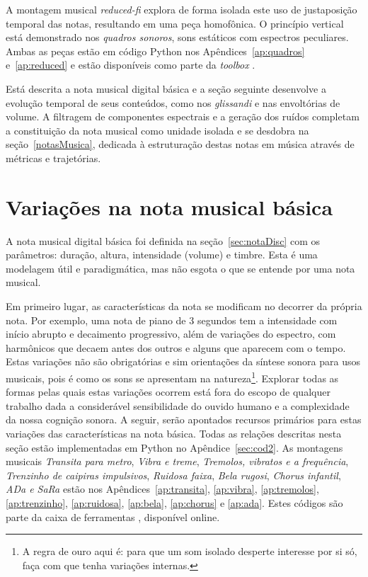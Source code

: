 A montagem musical \emph{reduced-fi} explora de forma isolada este uso de justaposição temporal das notas, resultando em uma peça homofônica. O princípio vertical está demonstrado nos \emph{quadros sonoros}, sons estáticos com espectros peculiares. Ambas as peças estão em código Python nos Apêndices~\ref{ap:quadros} e~\ref{ap:reduced} e estão disponíveis como parte da \emph{toolbox} \massa.\cite{MASSA}

Está descrita a nota musical digital básica e a seção seguinte desenvolve a evolução temporal de seus conteúdos, como nos \emph{glissandi} e nas envoltórias de volume. A filtragem de componentes espectrais e a geração dos ruídos completam a constituição da nota musical como unidade isolada e se desdobra na seção~\ref{notasMusica}, dedicada à estruturação destas notas em música através de métricas e trajetórias.




\afterpage{\blankpage}
\clearpage

\section{Variações na nota musical básica}\label{varInternas}

A nota musical digital básica foi definida na seção~\ref{sec:notaDisc} com os parâmetros:
duração, altura, intensidade (volume) e timbre. Esta é uma modelagem
útil e paradigmática, mas não esgota o que se entende por
uma nota musical.

Em primeiro lugar, as características da nota se modificam no decorrer
da própria nota.\cite{Chowning} Por exemplo, uma nota de piano
de 3 segundos tem a intensidade com início abrupto e decaimento progressivo,
além de variações do espectro, com harmônicos que
decaem antes dos outros e alguns que aparecem com o tempo.
Estas variações não são obrigatórias e sim orientações da
síntese sonora para usos musicais, pois é como os sons
se apresentam na natureza\footnote{A regra de ouro
aqui é: para que um som isolado desperte interesse
por si só, faça com que tenha variações internas.\cite{Roederer}}. 
Explorar todas as formas pelas quais estas variações ocorrem está fora
do escopo de qualquer trabalho dada a considerável sensibilidade do ouvido humano
e a complexidade da nossa cognição sonora. A seguir, serão apontados
recursos primários para estas variações das características na nota
básica.
Todas as relações descritas nesta seção estão implementadas em Python no Apêndice~\ref{sec:cod2}. As montagens musicais \emph{Transita para metro}, \emph{Vibra e treme}, \emph{Tremolos, vibratos e a frequência}, \emph{Trenzinho de caipiras impulsivos}, \emph{Ruidosa faixa}, \emph{Bela rugosi}, \emph{Chorus infantil}, \emph{ADa e SaRa} estão nos Apêndices~\ref{ap:transita}, \ref{ap:vibra}, \ref{ap:tremolos}, \ref{ap:trenzinho}, \ref{ap:ruidosa}, \ref{ap:bela}, \ref{ap:chorus} e \ref{ap:ada}. Estes códigos são parte da caixa de ferramentas \massa, disponível online.\cite{MASSA}



